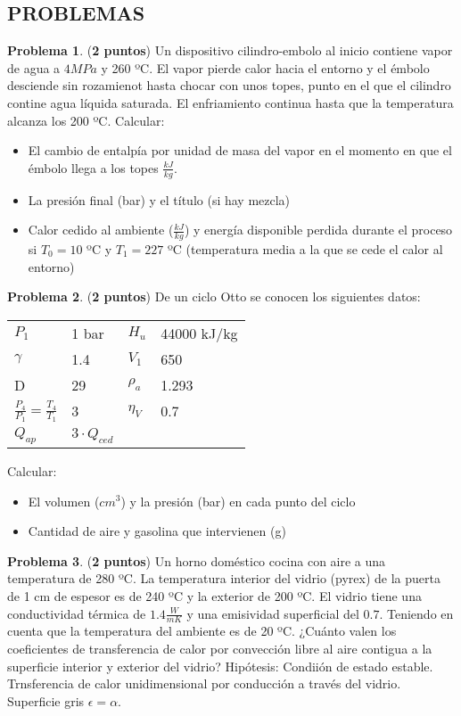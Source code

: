 \documentclass[10pt]{article}
\begin{document}
\subsection{PROBLEMAS}
\textbf{Problema 1}. (\textbf{2 puntos}) Un dispositivo cilindro-embolo al inicio contiene vapor de agua a $4 MPa$ y 260 ºC. El vapor pierde calor hacia el entorno y el émbolo desciende sin rozamienot hasta chocar con unos topes, punto en el que el cilindro contine agua líquida saturada. El enfriamiento continua hasta que la temperatura alcanza los 200 ºC. Calcular:
\begin{itemize}
    \item El cambio de entalpía por unidad de masa del vapor en el momento en que el émbolo llega a los topes $\frac{kJ}{kg}$.
    \item La presión final (bar) y el título (si hay mezcla)
    \item Calor cedido al ambiente ($\frac{kJ}{kg}$) y energía disponible perdida durante el proceso si $T _{0} = 10$ ºC y $T _{1}= 227$ ºC (temperatura media a la que se cede el calor al entorno)
\end{itemize}

\textbf{Problema 2}. (\textbf{2 puntos}) De un ciclo Otto se conocen los siguientes datos:
\begin{table}[h!]
    \centering
    \begin{tabular}{ll|ll}
    \hline
    $P _{1}$  & 1 bar & $H _{u}$ & 44000 kJ/kg \\
    $\gamma$  & 1.4   & $V _{1}$ & 650         \\
    D & 29    & $\rho _{a}$ & 1.293       \\
    $\frac{P _{4}}{P _{1}} =\frac{T _{4}}{T _{1} }$  & 3     & $\eta _{V}$ & 0.7         \\
     $Q _{ap}$  & $3\cdot Q _{ced}$     &  &             \\ \hline
    \end{tabular}
\end{table}
Calcular:
\begin{itemize}
    \item El volumen ($cm ^{3}$) y la presión (bar) en cada punto del ciclo
    \item Cantidad de aire y gasolina que intervienen (g)
\end{itemize}

\textbf{Problema 3}. (\textbf{2 puntos}) Un horno doméstico cocina con aire a una temperatura de 280 ºC. La temperatura interior del vidrio (pyrex) de la puerta de 1 cm de espesor es de 240 ºC y la exterior de 200 ºC. El vidrio tiene una conductividad térmica de $1.4 \frac{W}{m K}$ y una emisividad superficial del $0.7$. Teniendo en cuenta que la temperatura del ambiente es de 20 ºC. ¿Cuánto valen los coeficientes de transferencia de calor por convección libre al aire contigua a la superficie interior y exterior del vidrio?
Hipótesis: Condiión de estado estable. Trnsferencia de calor unidimensional por conducción a través del vidrio. Superficie gris $\epsilon = \alpha$.
\end{document}
